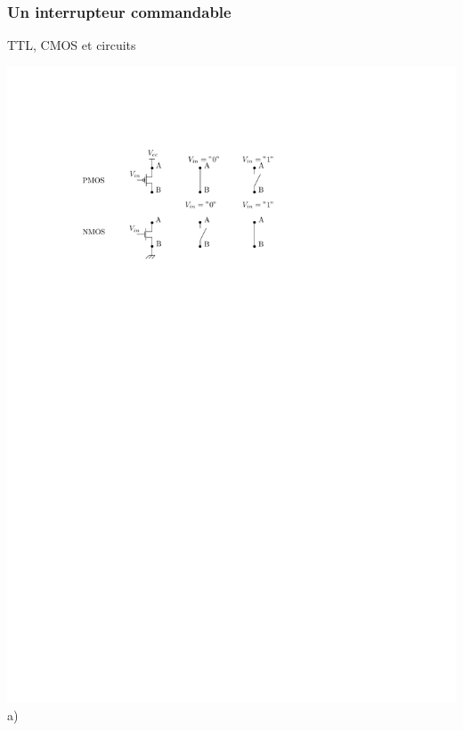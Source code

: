 \documentclass{beamer}
\begin{document}
\begin{frame}
  \frametitle{Un interrupteur commandable}
  \begin{block}{TTL, CMOS et circuits}
   \begin{minipage}[c]{.56\linewidth}
\includegraphics[width=\columnwidth]{Figs/nmospmos.pdf} \\\centering a)
   \end{minipage} \hfill
   \begin{minipage}[c]{.25\linewidth}

\end{minipage}
\end{block}
\end{frame}
\end{document}

